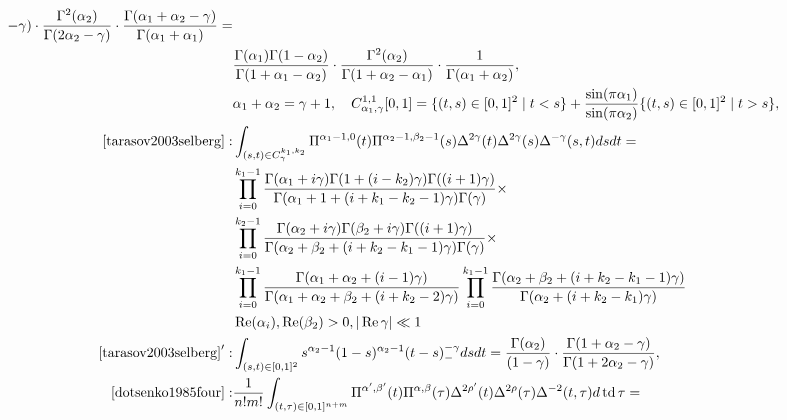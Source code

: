 \documentclass{article}
\newcommand{\tmop}[1]{\ensuremath{\operatorname{#1}}}
\begin{document}
\begin{eqnarray}
{  - \gamma)} \cdot \frac{\Gamma^2 (\alpha_2)}{\Gamma (2 \alpha_2 - \gamma)}
  \cdot \frac{\Gamma (\alpha_1 + \alpha_2 - \gamma)}{\Gamma (\alpha_1 +
  \alpha_1)} = &  \nonumber\\
  & \frac{\Gamma (\alpha_1) \Gamma (1 - \alpha_2)}{\Gamma (1 + \alpha_1 -
  \alpha_2)} \cdot \frac{\Gamma^2 (\alpha_2)}{\Gamma (1 + \alpha_2 -
  \alpha_1)} \cdot \frac{1}{\Gamma (\alpha_1 + \alpha_2)}, &  \nonumber\\
  & \alpha_1 + \alpha_2 = \gamma + 1, \quad C_{\alpha_1, \gamma}^{1, 1} [0,
  1] = \{ (t, s) \in [0, 1]^2 \mid t < s \} + \frac{\sin (\pi \alpha_1)}{\sin
  (\pi \alpha_2)} \{ (t, s) \in [0, 1]^2 \mid t > s \}, &  \nonumber\\
  \mathrm{{\cite[(3.3)]{tarasov2003selberg}}:} & \int_{(s, t) \in
  C_{\gamma}^{k_1, k_2}} \Pi^{\alpha_1 - 1, 0} (t) \Pi^{\alpha_2 - 1, \beta_2
  - 1} (s) \Delta^{2 \gamma} (t) \Delta^{2 \gamma} (s) \Delta^{- \gamma} (s,
  t) d s d t = &  \nonumber\\
  & \prod_{i = 0}^{k_1 - 1} \frac{\Gamma (\alpha_1 + i \gamma) \Gamma (1 + (i
  - k_2) \gamma) \Gamma ((i + 1) \gamma)}{\Gamma (\alpha_1 + 1 + (i + k_1 -
  k_2 - 1) \gamma) \Gamma (\gamma)} \times &  \nonumber\\
  & \prod_{i = 0}^{k_2 - 1} \frac{\Gamma (\alpha_2 + i \gamma) \Gamma
  (\beta_2 + i \gamma) \Gamma ((i + 1) \gamma)}{\Gamma (\alpha_2 + \beta_2 +
  (i + k_2 - k_1 - 1) \gamma) \Gamma (\gamma)} \times &  \nonumber\\
  & \prod_{i = 0}^{k_1 - 1} \frac{\Gamma (\alpha_1 + \alpha_2 + (i - 1)
  \gamma)}{\Gamma (\alpha_1 + \alpha_2 + \beta_2 + (i + k_2 - 2) \gamma)}
  \prod_{i = 0}^{k_1 - 1} \frac{\Gamma (\alpha_2 + \beta_2 + (i + k_2 - k_1 -
  1) \gamma)}{\Gamma (\alpha_2 + (i + k_2 - k_1) \gamma)} &  \nonumber\\
  & \tmop{Re} (\alpha_i), \tmop{Re} (\beta_2) > 0, | \tmop{Re} \gamma | \ll 1
  &  \nonumber\\
  \mathrm{{\cite{tarasov2003selberg}}}' : & \int_{(s, t) \in [0, 1]^2}
  s^{\alpha_2 - 1} (1 - s)^{\alpha_2 - 1} (t - s)_-^{- \gamma} d s d t =
  \frac{\Gamma (\alpha_2)}{(1 - \gamma)} \cdot \frac{\Gamma (1 + \alpha_2 -
  \gamma)}{\Gamma (1 + 2 \alpha_2 - \gamma)}, &  \nonumber\\
  \mathrm{{\cite[(A.35)]{dotsenko1985four}}:} & \frac{1}{n!m!} \int_{(t, \tau)
  \in [0, 1]^{n + m}} \Pi^{\alpha', \beta'} (t) \Pi^{\alpha, \beta} (\tau)
  \Delta^{2 \rho'} (t) \Delta^{2 \rho} (\tau) \Delta^{- 2} (t, \tau) d
  \tmop{td} \tau = &  \nonumber\\

\end{eqnarray}
\end{document}
